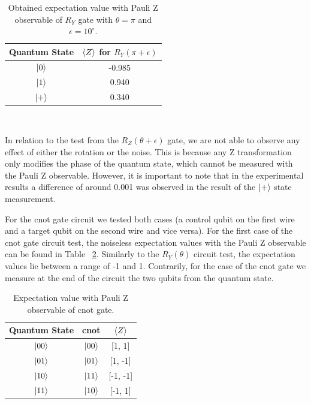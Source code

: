 \begin{table}[h]
  \centering
  \begin{tabular}{|c|c|}
    \hline
    Quantum State & \(\expval{Z}\) for \(R_{Y}\left(\pi+\epsilon\right)\) \\
    \hline
    \(\ket{0}\) & -0.985 \\
    \hline
    \(\ket{1}\) & 0.940 \\
    \hline
    \(\ket{+}\) &  0.340 \\
    \hline
  \end{tabular}
  \caption{Obtained expectation value with Pauli Z observable of \(R_{Y}\) gate with \(\theta = \pi\) and \(\epsilon = 10^{\circ}\).}\label{tab:ry_real_noise}
\end{table} \

In relation to the test from the \(R_{Z}(\theta + \epsilon)\) gate, we
are not able to observe any effect of either the rotation or the noise.
This is because any Z transformation only modifies the phase of the
quantum state, which cannot be measured with the Pauli Z observable.
However, it is important to note that in the experimental results
a difference of around 0.001 was observed in the result of the \(\ket{+}\)
state measurement. \

For the \ac{cnot} gate circuit we tested both cases (a control qubit on the
first wire and a target qubit on the second wire and vice versa). For
the first case of the \ac{cnot}  gate circuit test, the noiseless expectation
values with the Pauli Z observable can be found in Table
~\ref{tab:cnot_ideal}. Similarly to the \(R_{Y}(\theta)\) circuit test,
the expectation values lie between a range of -1 and 1. Contrarily,
for the case of the \ac{cnot}  gate we measure at the end of the circuit the
two qubits from the quantum state. \

\begin{table}[h]
  \centering
  \begin{tabular}{|c|c|c|}
    \hline
    Quantum State & \ac{cnot} & \(\expval{Z}\) \\
    \hline
    \(\ket{00}\) & \(\ket{00}\) & [1, 1] \\
    \hline
    \(\ket{01}\) & \(\ket{01}\) & [1, -1] \\
    \hline
    \(\ket{10}\) & \(\ket{11}\) & [-1, -1] \\
    \hline
    \(\ket{11}\) & \(\ket{10}\) & [-1, 1] \\
    \hline
  \end{tabular}
  \caption{Expectation value with Pauli Z observable of \ac{cnot} gate.}\label{tab:cnot_ideal}
\end{table} \

